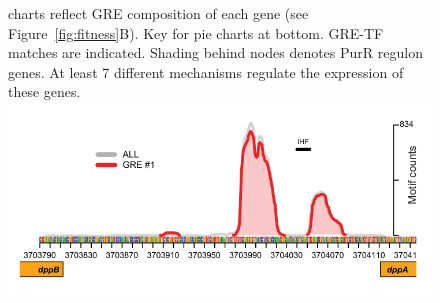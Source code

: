 \begin{figure}[hp]
{  charts reflect GRE composition of each gene (see
  Figure~\ref{fig:fitness}B). Key for pie charts at bottom. GRE-TF
  matches are indicated. Shading behind nodes denotes PurR regulon
  genes. At least 7 different mechanisms regulate the expression of
  these genes.  }%
\DIFdelendFL \DIFaddbeginFL \includegraphics[width=0.95\linewidth]{figures/dpp_ecoli.pdf}
\caption[Evidence for condition-specific transcript isoforms of the \textit{dpp} operon in \textit{E. coli}]{\textbf{\textit{} \textit{}} \egrine{}\textit{}  \textit{} \textit{} }
\label{fig:dpp_ecoli}
\DIFaddendFL \end{figure}

